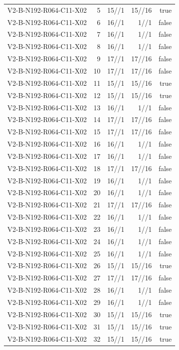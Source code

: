 {\begin{longtable}{lrrrr}
V2-B-N192-R064-C11-X02 & 5 & 15//1 & 15//16 & true \\
V2-B-N192-R064-C11-X02 & 6 & 16//1 & 1//1 & false \\
V2-B-N192-R064-C11-X02 & 7 & 16//1 & 1//1 & false \\
V2-B-N192-R064-C11-X02 & 8 & 16//1 & 1//1 & false \\
V2-B-N192-R064-C11-X02 & 9 & 17//1 & 17//16 & false \\
V2-B-N192-R064-C11-X02 & 10 & 17//1 & 17//16 & false \\
V2-B-N192-R064-C11-X02 & 11 & 15//1 & 15//16 & true \\
V2-B-N192-R064-C11-X02 & 12 & 15//1 & 15//16 & true \\
V2-B-N192-R064-C11-X02 & 13 & 16//1 & 1//1 & false \\
V2-B-N192-R064-C11-X02 & 14 & 17//1 & 17//16 & false \\
V2-B-N192-R064-C11-X02 & 15 & 17//1 & 17//16 & false \\
V2-B-N192-R064-C11-X02 & 16 & 16//1 & 1//1 & false \\
V2-B-N192-R064-C11-X02 & 17 & 16//1 & 1//1 & false \\
V2-B-N192-R064-C11-X02 & 18 & 17//1 & 17//16 & false \\
V2-B-N192-R064-C11-X02 & 19 & 16//1 & 1//1 & false \\
V2-B-N192-R064-C11-X02 & 20 & 16//1 & 1//1 & false \\
V2-B-N192-R064-C11-X02 & 21 & 17//1 & 17//16 & false \\
V2-B-N192-R064-C11-X02 & 22 & 16//1 & 1//1 & false \\
V2-B-N192-R064-C11-X02 & 23 & 16//1 & 1//1 & false \\
V2-B-N192-R064-C11-X02 & 24 & 16//1 & 1//1 & false \\
V2-B-N192-R064-C11-X02 & 25 & 16//1 & 1//1 & false \\
V2-B-N192-R064-C11-X02 & 26 & 15//1 & 15//16 & true \\
V2-B-N192-R064-C11-X02 & 27 & 17//1 & 17//16 & false \\
V2-B-N192-R064-C11-X02 & 28 & 16//1 & 1//1 & false \\
V2-B-N192-R064-C11-X02 & 29 & 16//1 & 1//1 & false \\
V2-B-N192-R064-C11-X02 & 30 & 15//1 & 15//16 & true \\
V2-B-N192-R064-C11-X02 & 31 & 15//1 & 15//16 & true \\
V2-B-N192-R064-C11-X02 & 32 & 15//1 & 15//16 & true \\

\end{longtable}}
